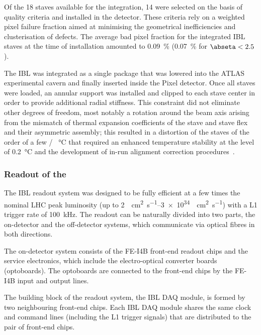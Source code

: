 \documentclass[cernpreprint, atlasdraft=false, UKenglish,british,orcidlogo, texmf, orcidlogo]{atlasdoc}
\begin{document}
Of the \num{18} staves available for the integration, \num{14} were selected on the basis of quality criteria and installed in the detector.
These criteria rely on a weighted pixel failure fraction aimed at minimising the geometrical inefficiencies and clusterisation of defects.
The average bad pixel fraction for the integrated \gls{IBL} staves at the time of installation amounted to \SI{0.09}{\percent} (\SI{0.07}{\percent} for $\abseta<2.5$).
 
The \gls{IBL} was integrated as a single package that was lowered into the ATLAS experimental cavern and finally inserted inside the Pixel detector.
Once all staves were loaded, an annular support was installed and clipped to each stave center in order to provide additional radial stiffness.
This constraint did not eliminate other degrees of freedom, most notably a rotation around the beam axis arising from the mismatch of thermal expansion coefficients of the stave and stave flex and their asymmetric assembly; this resulted in a distortion of the staves of the order of a few \SI{}{\micron} / \SI{}{\degreeCelsius} that required an enhanced temperature stability at the level of \SI{0.2}{\degreeCelsius} and the development of in-run alignment correction procedures~\cite{IDTR-2019-05}.
 
\subsubsection{Readout of the }
\label{sec:IBL-Readout}
 
The \gls{IBL} readout system was designed to be fully efficient at a few times the nominal \gls{LHC} peak luminosity
(up to \SIrange[range-phrase=--]{2}{3e34}{\per\cm\squared\per\second})  with a \gls{L1} trigger rate of \SI{100}{kHz}.
The readout can be naturally divided into two parts, the on-detector and the off-detector systems, which communicate via optical fibres in both directions.
 
The on-detector system consists of the FE-I4B front-end readout chips and the service electronics, which include the electro-optical converter boards (optoboards).  The optoboards are connected to the front-end chips by the FE-I4B input and output lines.
 
The building block of the readout system, the \gls{IBL} \gls{DAQ} module, is formed by two neighbouring front-end chips.
Each \gls{IBL} \gls{DAQ} module shares the same clock and command lines (including the \gls{L1} trigger signals) that are distributed to the pair of front-end chips.
 
\end{document}
